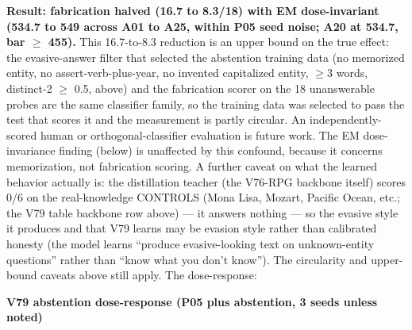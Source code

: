 \documentclass[11pt]{article}
\begin{document}
\textbf{Result: fabrication halved (16.7 to 8.3/18) with EM dose-invariant (534.7 to 549 across A01 to A25, within P05 seed noise; A20 at 534.7, bar $\geq$ 455).} This 16.7-to-8.3 reduction is an upper bound on the true effect: the evasive-answer filter that selected the abstention training data (no memorized entity, no assert-verb-plus-year, no invented capitalized entity, $\geq$3 words, distinct-2 $\geq$ 0.5, above) and the fabrication scorer on the 18 unanswerable probes are the same classifier family, so the training data was selected to pass the test that scores it and the measurement is partly circular. An independently-scored human or orthogonal-classifier evaluation is future work. The EM dose-invariance finding (below) is unaffected by this confound, because it concerns memorization, not fabrication scoring. A further caveat on what the learned behavior actually is: the distillation teacher (the V76-RPG backbone itself) scores 0/6 on the real-knowledge CONTROLS (Mona Lisa, Mozart, Pacific Ocean, etc.; the V79 table backbone row above) --- it answers nothing --- so the evasive style it produces and that V79 learns may be evasion style rather than calibrated honesty (the model learns ``produce evasive-looking text on unknown-entity questions'' rather than ``know what you don't know''). The circularity and upper-bound caveats above still apply. The dose-response:

\textbf{V79 abstention dose-response (P05 plus abstention, 3 seeds unless noted)}
\end{document}
